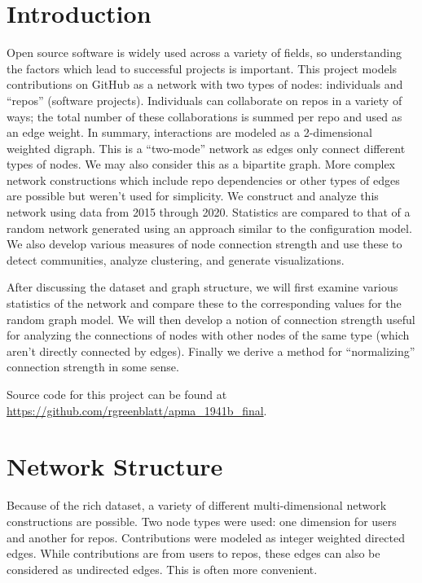 \documentclass{pset}
\begin{document}
\section*{Introduction}

Open source software is widely used across a variety of fields, so
understanding the factors which lead to successful projects is important.  This
project models contributions on GitHub as a network with two types of nodes:
individuals and ``repos'' (software projects). Individuals can collaborate on
repos in a variety of ways; the total number of these collaborations is summed
per repo and used as an edge weight. In summary, interactions are modeled as a
2-dimensional weighted digraph. This is a ``two-mode'' network as edges only
connect different types of nodes. We may also consider this as a bipartite
graph. More complex network constructions which include repo dependencies or
other types of edges are possible but weren't used for simplicity.  We
construct and analyze this network using data from 2015 through 2020. Statistics
are compared to that of a random network generated using an approach
similar to the configuration model.  We also develop various measures of node
connection strength and use these to detect communities, analyze clustering,
and generate visualizations.

After discussing the dataset and graph structure, we will first examine various
statistics of the network and compare these to the corresponding values for the
random graph model. We will then develop a notion of connection strength useful
for analyzing the connections of nodes with other nodes of the same type (which
aren't directly connected by edges). Finally we derive a method for
``normalizing'' connection strength in some sense.


Source code for this project can be found  at
\href{https://github.com/rgreenblatt/apma_1941b_final}
{https://github.com/rgreenblatt/apma\_1941b\_final}.


\section*{Network Structure}

Because of the rich dataset, a variety of different multi-dimensional network
constructions are possible. Two node types were used: one dimension for
users and another for repos. Contributions were modeled as integer weighted
directed edges. While contributions are from users to repos, these edges can
also be considered as undirected edges. This is often more convenient.
\end{document}
